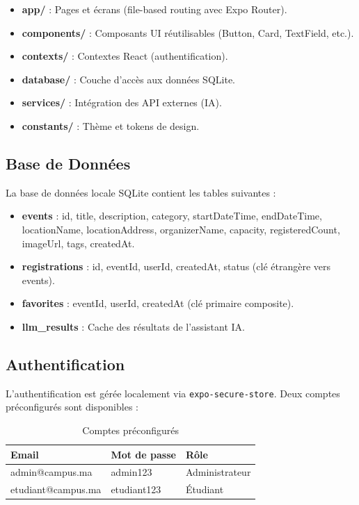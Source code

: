 \documentclass[12pt,a4paper]{article}
\begin{document}
\begin{itemize}
    \item \textbf{app/} : Pages et écrans (file-based routing avec Expo Router).
    \item \textbf{components/} : Composants UI réutilisables (Button, Card, TextField, etc.).
    \item \textbf{contexts/} : Contextes React (authentification).
    \item \textbf{database/} : Couche d'accès aux données SQLite.
    \item \textbf{services/} : Intégration des API externes (IA).
    \item \textbf{constants/} : Thème et tokens de design.
\end{itemize}

\subsection{Base de Données}

La base de données locale SQLite contient les tables suivantes :

\begin{itemize}
    \item \textbf{events} : id, title, description, category, startDateTime, endDateTime, locationName, locationAddress, organizerName, capacity, registeredCount, imageUrl, tags, createdAt.
    \item \textbf{registrations} : id, eventId, userId, createdAt, status (clé étrangère vers events).
    \item \textbf{favorites} : eventId, userId, createdAt (clé primaire composite).
    \item \textbf{llm\_results} : Cache des résultats de l'assistant IA.
\end{itemize}

\subsection{Authentification}

L'authentification est gérée localement via \texttt{expo-secure-store}. Deux comptes préconfigurés sont disponibles :

\begin{table}[H]
    \centering
    \begin{tabularx}{\textwidth}{|l|l|X|}
        \hline
        \textbf{Email} & \textbf{Mot de passe} & \textbf{Rôle} \\
        \hline
        admin@campus.ma & admin123 & Administrateur \\
        etudiant@campus.ma & etudiant123 & Étudiant \\
        \hline
    \end{tabularx}
    \caption{Comptes préconfigurés}
\end{table}
\end{document}
